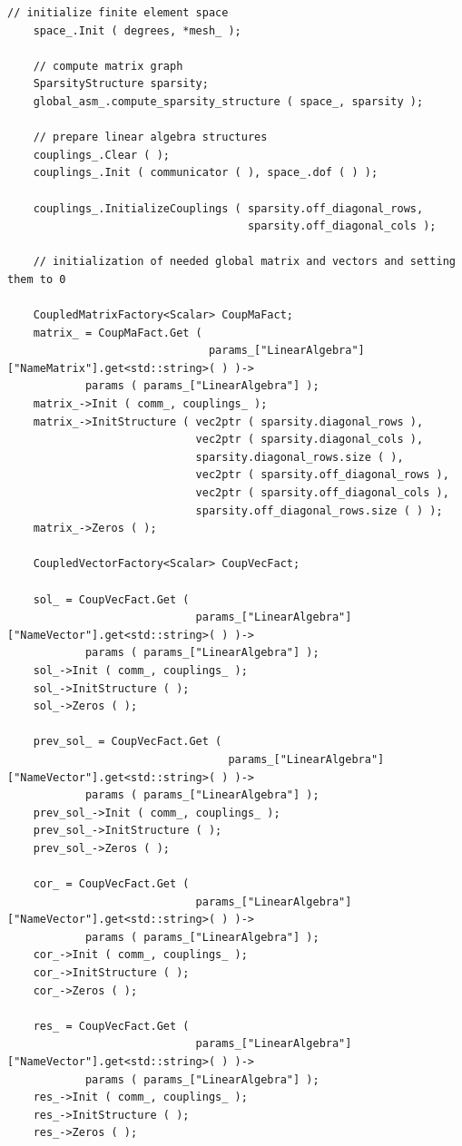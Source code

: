 \documentclass{article}
\begin{document}
\begin{lstlisting}[firstnumber=280]
    // initialize finite element space
    space_.Init ( degrees, *mesh_ );

    // compute matrix graph
    SparsityStructure sparsity;
    global_asm_.compute_sparsity_structure ( space_, sparsity );

    // prepare linear algebra structures
    couplings_.Clear ( );
    couplings_.Init ( communicator ( ), space_.dof ( ) );

    couplings_.InitializeCouplings ( sparsity.off_diagonal_rows,
                                     sparsity.off_diagonal_cols );

    // initialization of needed global matrix and vectors and setting them to 0

    CoupledMatrixFactory<Scalar> CoupMaFact;
    matrix_ = CoupMaFact.Get (
                               params_["LinearAlgebra"]["NameMatrix"].get<std::string>( ) )->
            params ( params_["LinearAlgebra"] );
    matrix_->Init ( comm_, couplings_ );
    matrix_->InitStructure ( vec2ptr ( sparsity.diagonal_rows ),
                             vec2ptr ( sparsity.diagonal_cols ),
                             sparsity.diagonal_rows.size ( ),
                             vec2ptr ( sparsity.off_diagonal_rows ),
                             vec2ptr ( sparsity.off_diagonal_cols ),
                             sparsity.off_diagonal_rows.size ( ) );
    matrix_->Zeros ( );

    CoupledVectorFactory<Scalar> CoupVecFact;

    sol_ = CoupVecFact.Get (
                             params_["LinearAlgebra"]["NameVector"].get<std::string>( ) )->
            params ( params_["LinearAlgebra"] );
    sol_->Init ( comm_, couplings_ );
    sol_->InitStructure ( );
    sol_->Zeros ( );

    prev_sol_ = CoupVecFact.Get (
                                  params_["LinearAlgebra"]["NameVector"].get<std::string>( ) )->
            params ( params_["LinearAlgebra"] );
    prev_sol_->Init ( comm_, couplings_ );
    prev_sol_->InitStructure ( );
    prev_sol_->Zeros ( );

    cor_ = CoupVecFact.Get (
                             params_["LinearAlgebra"]["NameVector"].get<std::string>( ) )->
            params ( params_["LinearAlgebra"] );
    cor_->Init ( comm_, couplings_ );
    cor_->InitStructure ( );
    cor_->Zeros ( );

    res_ = CoupVecFact.Get (
                             params_["LinearAlgebra"]["NameVector"].get<std::string>( ) )->
            params ( params_["LinearAlgebra"] );
    res_->Init ( comm_, couplings_ );
    res_->InitStructure ( );
    res_->Zeros ( );


\end{lstlisting}
\end{document}

